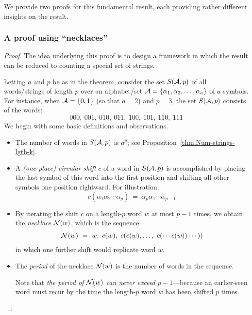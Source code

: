 %

\noindent
We provide two proofs for this fundamental result, each providing
rather different insights on the result.


\subsubsection{A proof using ``necklaces''}
\label{sec:FTL-necklaces}

\begin{proof}
The idea underlying this proof is to design a framework in which the
result can be reduced to counting a special set of strings.

Letting $a$ and $p$ be as in the theorem, consider the set $S(\mbox{$\cal A$},p)$ of
all words/strings of length $p$ over an alphabet/set $\mbox{$\cal A$} = \{ \alpha_1,
\alpha_2, \ldots, \alpha_a \}$ of $a$ symbols.  For instance, when $\mbox{$\cal A$}
= \{0,1\}$ (so that $a=2$) and $p=3$, the set $S(\mbox{$\cal A$},p)$ consists of the
words:
\[ 000, \ 001, \ 010, \ 011, \ 100, \ 101, \ 110, \ 111 \]
We begin with some basic definitions and observations.
\begin{itemize}
\item
The number of words in $S(\mbox{$\cal A$},p)$ is $a^p$; see
Proposition~\ref{thm:Num-strings-lgth-k}.

\item
A {\it (one-place) circular shift} $c$ of a word in $S(\mbox{$\cal A$},p)$ is
accomplished by placing the last symbol of this word into the first
position and shifting all other symbols one position rightward.  For
illustration:
\[ c(\alpha_1 \alpha_2 \cdots \alpha_p) \ = \ \alpha_p \alpha_1 \cdots
\alpha_{p-1} \]

\item
By iterating the shift $c$ on a length-$p$ word $w$ at most $p-1$
times, we obtain the {\it necklace} $\mbox{$\cal N$}(w)$, which is the sequence
\[ \n(w) \ = \ w, \ c(w), \ c(c(w), \ldots, \ c(\cdots c(w)) \cdots )) \]
in which one further shift would replicate word $w$.

\item
The {\it period} of the necklace $\mbox{$\cal N$}(w)$ is the number of words in the
sequence.

Note that {\em the period of $\mbox{$\cal N$}(w)$ can never exceed $p-1$}---because
an earlier-seen word must recur by the time the length-$p$ word $w$
has been shifted $p$ times.
\end{itemize}


\end{proof}
